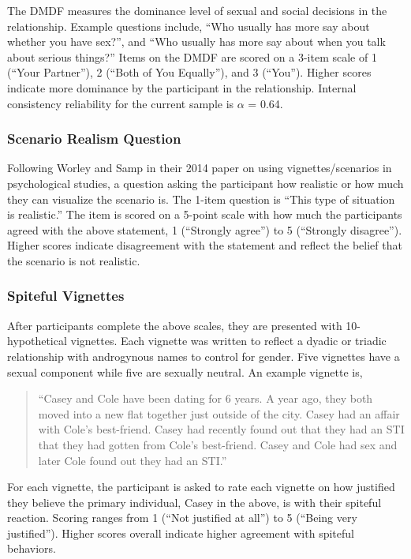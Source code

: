 \documentclass[
  donotrepeattitle,doc, 12pt, a4paper,floatsintext]{apa7}
\begin{document}
The DMDF measures the dominance level of sexual and social decisions in the relationship. Example questions include, ``Who usually has more say about whether you have sex?'', and ``Who usually has more say about when you talk about serious things?'' Items on the DMDF are scored on a 3-item scale of 1 (``Your Partner''), 2 (``Both of You Equally''), and 3 (``You''). Higher scores indicate more dominance by the participant in the relationship. Internal consistency reliability for the current sample is \(\alpha\) = 0.64.

\hypertarget{scenario-realism-question-1}{%
\subsubsection{Scenario Realism Question}\label{scenario-realism-question-1}}

Following Worley and Samp in their 2014 paper on using vignettes/scenarios in psychological studies, a question asking the participant how realistic or how much they can visualize the scenario is. The 1-item question is ``This type of situation is realistic.'' The item is scored on a 5-point scale with how much the participants agreed with the above statement, 1 (``Strongly agree'') to 5 (``Strongly disagree''). Higher scores indicate disagreement with the statement and reflect the belief that the scenario is not realistic.

\hypertarget{spiteful-vignettes-1}{%
\subsubsection{Spiteful Vignettes}\label{spiteful-vignettes-1}}

After participants complete the above scales, they are presented with 10-hypothetical vignettes. Each vignette was written to reflect a dyadic or triadic relationship with androgynous names to control for gender. Five vignettes have a sexual component while five are sexually neutral. An example vignette is,

\begin{quote}
``Casey and Cole have been dating for 6 years. A year ago, they both moved into a new flat together just outside of the city. Casey had an affair with Cole's best-friend. Casey had recently found out that they had an STI that they had gotten from Cole's best-friend. Casey and Cole had sex and later Cole found out they had an STI.''
\end{quote}

For each vignette, the participant is asked to rate each vignette on how justified they believe the primary individual, Casey in the above, is with their spiteful reaction. Scoring ranges from 1 (``Not justified at all'') to 5 (``Being very justified''). Higher scores overall indicate higher agreement with spiteful behaviors.
\end{document}

